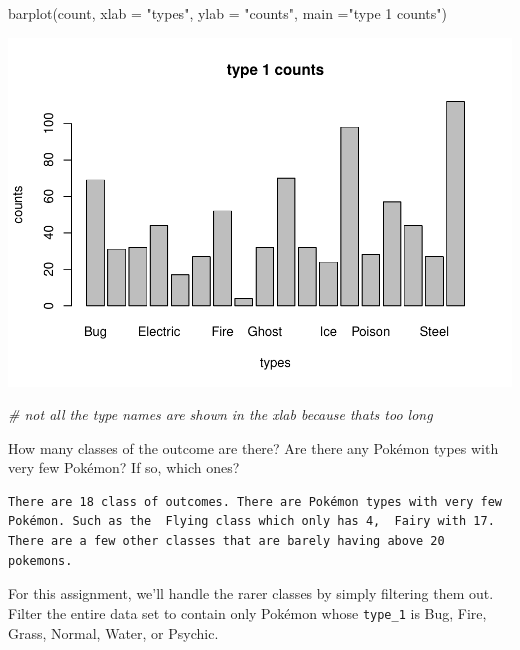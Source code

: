 \documentclass[
]{article}
\newenvironment{Shaded}{\begin{snugshade}}{\end{snugshade}}
\newcommand{\AttributeTok}[1]{\textcolor[rgb]{0.77,0.63,0.00}{#1}}
\newcommand{\CommentTok}[1]{\textcolor[rgb]{0.56,0.35,0.01}{\textit{#1}}}
\newcommand{\FunctionTok}[1]{\textcolor[rgb]{0.00,0.00,0.00}{#1}}
\newcommand{\NormalTok}[1]{#1}
\newcommand{\StringTok}[1]{\textcolor[rgb]{0.31,0.60,0.02}{#1}}
\begin{document}
\begin{Shaded}
\begin{Highlighting}[]
\FunctionTok{barplot}\NormalTok{(count, }\AttributeTok{xlab =} \StringTok{"types"}\NormalTok{, }\AttributeTok{ylab =} \StringTok{"counts"}\NormalTok{, }\AttributeTok{main =}\StringTok{"type 1 counts"}\NormalTok{)}
\end{Highlighting}
\end{Shaded}

\includegraphics{PSTAT131HW05_files/figure-latex/unnamed-chunk-3-1.pdf}

\begin{Shaded}
\begin{Highlighting}[]
\CommentTok{\# not all the type names are shown in the xlab because thats too long}
\end{Highlighting}
\end{Shaded}

How many classes of the outcome are there? Are there any Pokémon types
with very few Pokémon? If so, which ones?

\begin{verbatim}
There are 18 class of outcomes. There are Pokémon types with very few Pokémon. Such as the  Flying class which only has 4,  Fairy with 17. There are a few other classes that are barely having above 20 pokemons. 
\end{verbatim}

For this assignment, we'll handle the rarer classes by simply filtering
them out. Filter the entire data set to contain only Pokémon whose
\texttt{type\_1} is Bug, Fire, Grass, Normal, Water, or Psychic.
\end{document}
